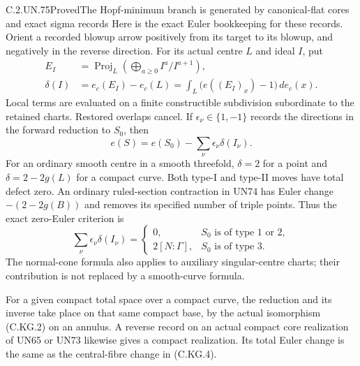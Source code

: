 \begin{statement}{C.2.UN.75}{Proved}{The Hopf-minimum branch is generated by canonical-flat cores and exact sigma records}
Here is the exact Euler bookkeeping for these records.
Orient a recorded blowup arrow positively from its target
to its blowup, and negatively in the reverse direction.
For its actual centre $L$ and ideal $I$, put
\[
 \begin{split}
  E_I&=\operatorname{Proj}_L\left(\bigoplus_{a\ge0}
                                      I^a/I^{a+1}\right),\\
  \delta(I)&=e_c(E_I)-e_c(L)
       =\int_L\bigl(e((E_I)_x)-1\bigr)\,de_c(x).
 \end{split}
\tag{C.KG.3}
\]
Local terms are evaluated on a finite constructible
subdivision subordinate to the retained charts. Restored
overlaps cancel. If $\epsilon_\nu\in\{1,-1\}$ records
the directions in the forward reduction to $S_0$, then
\[
             e(S)=e(S_0)-\sum_\nu\epsilon_\nu\delta(I_\nu).
\tag{C.KG.4}
\]
For an ordinary smooth centre in a smooth threefold,
$\delta=2$ for a point and $\delta=2-2g(L)$ for a compact
curve. Both type-I and type-II moves have total defect
zero. An ordinary ruled-section contraction in UN74 has
Euler change $-(2-2g(B))$ and removes its specified number
of triple points. Thus the exact zero-Euler criterion is
\[
 \sum_\nu\epsilon_\nu\delta(I_\nu)=
 \begin{cases}
 0,&S_0\text{ is of type 1 or 2},\\
 2[N:\Gamma],&S_0\text{ is of type 3}.
 \end{cases}
\tag{C.KG.5}
\]
The normal-cone formula also applies to auxiliary
singular-centre charts; their contribution is not
replaced by a smooth-curve formula.

For a given compact total space over a compact curve,
the reduction and its inverse take place on that same
compact base, by the actual isomorphism (C.KG.2) on an
annulus. A reverse record on an actual compact core
realization of UN65 or UN73 likewise gives a compact
realization. Its total Euler change is the same as
the central-fibre change in (C.KG.4).
\end{statement}

